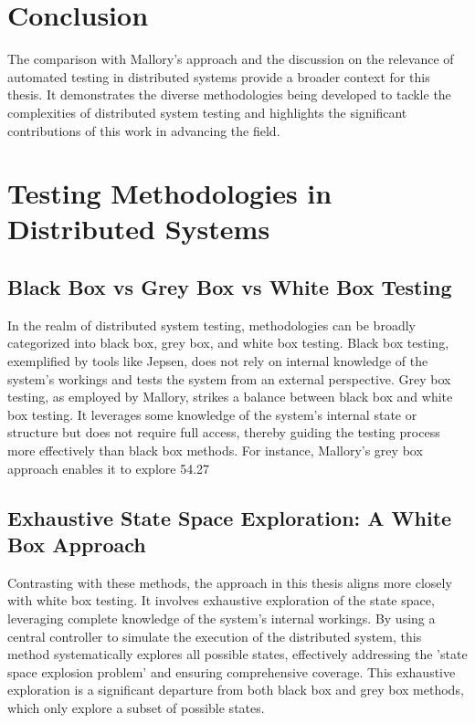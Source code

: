 \documentclass[a4paper,11pt,oneside]{report}
\begin{document}
\section{Conclusion}
The comparison with Mallory's approach and the discussion on the relevance of automated testing in distributed systems provide a broader context for this thesis. It demonstrates the diverse methodologies being developed to tackle the complexities of distributed system testing and highlights the significant contributions of this work in advancing the field.

\section{Testing Methodologies in Distributed Systems}

\subsection{Black Box vs Grey Box vs White Box Testing}
In the realm of distributed system testing, methodologies can be broadly categorized into black box, grey box, and white box testing. Black box testing, exemplified by tools like Jepsen, does not rely on internal knowledge of the system's workings and tests the system from an external perspective. Grey box testing, as employed by Mallory, strikes a balance between black box and white box testing. It leverages some knowledge of the system's internal state or structure but does not require full access, thereby guiding the testing process more effectively than black box methods. For instance, Mallory's grey box approach enables it to explore 54.27%

\subsection{Exhaustive State Space Exploration: A White Box Approach}
Contrasting with these methods, the approach in this thesis aligns more closely with white box testing. It involves exhaustive exploration of the state space, leveraging complete knowledge of the system's internal workings. By using a central controller to simulate the execution of the distributed system, this method systematically explores all possible states, effectively addressing the 'state space explosion problem' and ensuring comprehensive coverage. This exhaustive exploration is a significant departure from both black box and grey box methods, which only explore a subset of possible states.
\end{document}
